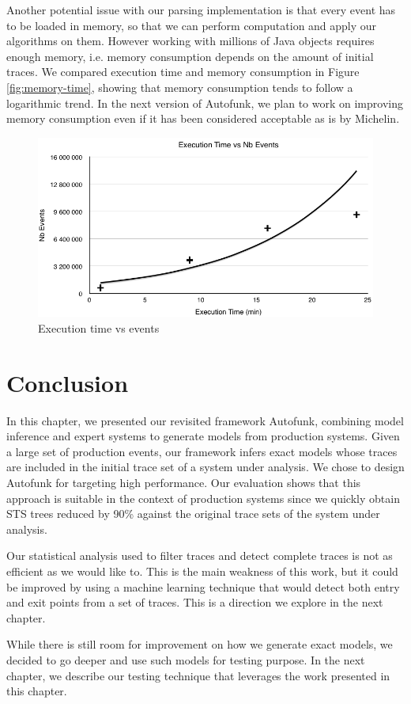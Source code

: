 Another potential issue with our parsing implementation is that
every event has to be loaded in memory, so that we can perform
computation and apply our algorithms on them. However working
with millions of Java objects requires enough memory, i.e.
memory consumption depends on the amount of initial traces. We
compared execution time and memory consumption in Figure
\ref{fig:memory-time}, showing that memory consumption tends to
follow a logarithmic trend. In the next version of Autofunk, we
plan to work on improving memory consumption even if it has been
considered acceptable as is by Michelin.

\begin{figure}[ht]
  \includegraphics[width=0.9\linewidth]{figures/time-vs-messages.png}

  \caption{Execution time vs events}
  \label{fig:time-vs-messages}
\end{figure}


\section{Conclusion}
\label{sec:modelinf:prodsystems:conclusion}

In this chapter, we presented our revisited framework Autofunk,
combining model inference and expert systems to generate models
from production systems. Given a large set of production events,
our framework infers exact models whose traces are included in
the initial trace set of a system under analysis. We chose to
design Autofunk for targeting high performance. Our evaluation
shows that this approach is suitable in the context of production
systems since we quickly obtain STS trees reduced by 90\% against
the original trace sets of the system under analysis.

Our statistical analysis used to filter traces and detect
complete traces is not as efficient as we would like to. This is
the main weakness of this work, but it could be improved by using
a machine learning technique that would detect both entry and
exit points from a set of traces. This is a direction we explore
in the next chapter.

While there is still room for improvement on how we generate
exact models, we decided to go deeper and use such models for
testing purpose. In the next chapter, we describe our testing
technique that leverages the work presented in this chapter.
